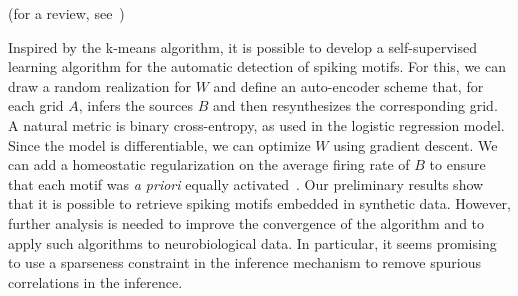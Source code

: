 \documentclass[runningheads]{llncs}
\begin{document}
(for a review, see~\cite{grimaldi_precise_2022})




Inspired by the k-means algorithm, it is possible to develop a self-supervised learning algorithm for the automatic detection of spiking motifs. For this, we can draw a random realization for $W$ and define an auto-encoder scheme that, for each grid $A$, infers the sources $B$ and then resynthesizes the corresponding grid. A natural metric is binary cross-entropy, as used in the logistic regression model. Since the model is differentiable, we can optimize $W$ using gradient descent. We can add a homeostatic regularization on the average firing rate of $B$ to ensure that each motif was \emph{a priori} equally activated~\cite{perrinet_role_2010,perrinet_adaptive_2019}. Our preliminary results show that it is possible to retrieve spiking motifs embedded in synthetic data. However, further analysis is needed to improve the convergence of the algorithm and to apply such algorithms to neurobiological data. In particular, it seems promising to use a sparseness constraint in the inference mechanism to remove spurious correlations in the inference.
%
%
%
%
\end{document}

